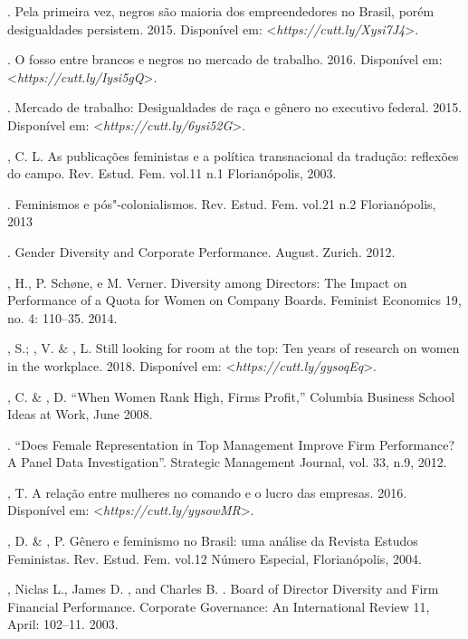 \begin{bibliohedra}
\titidem. Pela primeira vez, negros são maioria dos
empreendedores no Brasil, porém desigualdades persistem. 2015.
Disponível em: \textless{}\emph{https://cutt.ly/Xysi7J4}\textgreater{}.

\titidem. O fosso entre brancos e negros no mercado de trabalho.
2016.
Disponível em: \textless{}\emph{https://cutt.ly/Iysi5gQ}\textgreater{}.

\titidem. Mercado de trabalho: Desigualdades de raça e gênero
no executivo federal. 2015.
Disponível em: \textless{}\emph{https://cutt.ly/6ysi52G}\textgreater{}.

, C. L. As publicações feministas e a política transnacional da
tradução: reflexões do campo. Rev. Estud. Fem. vol.11 n.1 Florianópolis,
2003.

\titidem. Feminismos e pós"-colonialismos. Rev. Estud. Fem. vol.21
n.2 Florianópolis, 2013

. Gender Diversity and Corporate
Performance. August. Zurich. 2012.

, H., P. Schøne, e M. Verner. Diversity among Directors: The
Impact on Performance of a Quota for Women on Company Boards. Feminist
Economics 19, no. 4: 110--35. 2014.

, S.; , V. \& , L. Still looking for room at the top:
Ten years of research on women in the workplace. 2018.
Disponível em: \textless{}\emph{https://cutt.ly/gysoqEq}\textgreater{}.

, C. \& , D. ``When Women Rank High, Firms Profit,'' Columbia
Business School Ideas at Work, June 2008.

\titidem. ``Does Female Representation in Top Management
Improve Firm Performance? A Panel Data Investigation''. Strategic
Management Journal, vol. 33, n.9, 2012.

, T. A relação entre mulheres no comando e o lucro das empresas.
2016.
Disponível em: \textless{}\emph{https://cutt.ly/yysowMR}\textgreater{}.

, D. \& , P. Gênero e feminismo no Brasil: uma análise da
Revista Estudos Feministas. Rev. Estud. Fem. vol.12 Número Especial,
Florianópolis, 2004.

, Niclas L., James D. , and Charles B. . Board of
Director Diversity and Firm Financial Performance. Corporate Governance:
An International Review 11, April: 102--11. 2003.


\end{bibliohedra}
